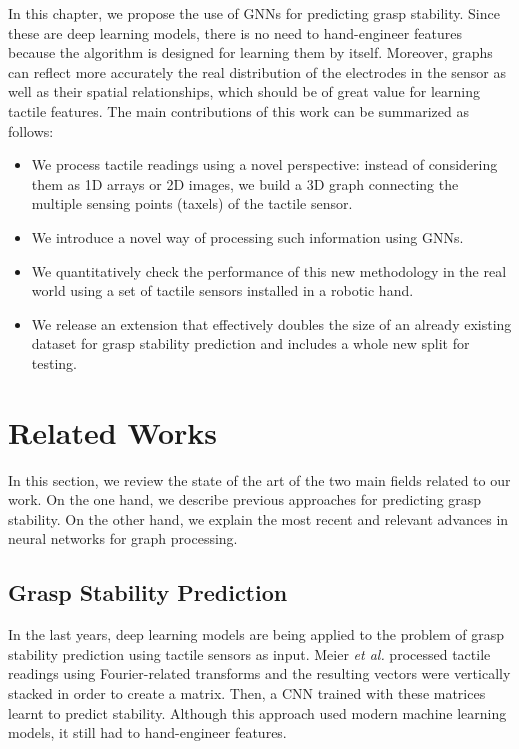 In this chapter, we propose the use of \acp{GNN} for predicting grasp stability. Since these are deep learning models, there is no need to hand-engineer features because the algorithm is designed for learning them by itself. Moreover, graphs can reflect more accurately the real distribution of the electrodes in the sensor as well as their spatial relationships, which should be of great value for learning tactile features. The main contributions of this work can be summarized as follows:

\begin{itemize}
	\item We process tactile readings using a novel perspective: instead of considering them as 1D arrays or 2D images, we build a 3D graph connecting the multiple sensing points (taxels) of the tactile sensor.

	\item We introduce a novel way of processing such information using \acfp{GNN}.
	
	\item We quantitatively check the performance of this new methodology in the real world using a set of tactile sensors installed in a robotic hand.

	\item We release an extension that effectively doubles the size of an already existing dataset \cite{Zapata2018} for grasp stability prediction and includes a whole new split for testing.
\end{itemize}

\section{Related Works}
\label{cha:tactile:sec:relatedworks}

In this section, we review the state of the art of the two main fields related to our work. On the one hand, we describe previous approaches for predicting grasp stability. On the other hand, we explain the most recent and relevant advances in neural networks for graph processing.

\subsection{Grasp Stability Prediction}
\label{cha:tactile:sec:relatedworks:subsec:grasp-stability-prediction}

In the last years, deep learning models are being applied to the problem of grasp stability prediction using tactile sensors as input. Meier \emph{et al.} \cite{Meier2016a} processed tactile readings using Fourier-related transforms and the resulting vectors were vertically stacked in order to create a matrix. Then, a \ac{CNN} trained with these matrices learnt to predict stability. Although this approach used modern machine learning models, it still had to hand-engineer features.

